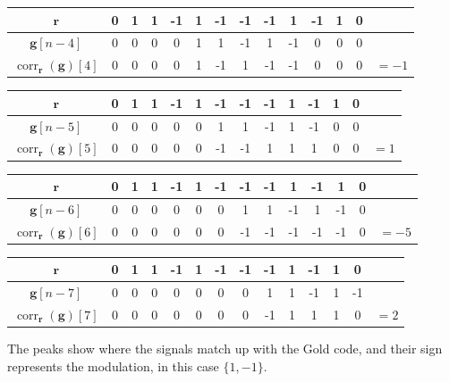 \documentclass[]{article}
\renewcommand{\vec}[1]{\mathbf{#1}}
\newcommand{\corr}{\operatorname{corr}}
\begin{document}
\begin{center}
\begin{tabular}{c|ccccccccccccc}
\end{tabular} \vspace{5 mm}
\begin{tabular}{c|ccccccccccccc}
	\(\vec{r}\) & 0 & 1 & 1 & -1 & 1 & -1 & -1 & -1 & 1 & -1 & 1 & 0 \\
	\hline
	\(\vec{g}[n - 4]\) & 0 & 0 & 0 & 0 & 1 & 1 & -1 & 1 & -1 & 0 & 0 & 0 \\
	\hline
	\(\corr_{\vec{r}}(\vec{g})[4]\) & 0 & 0 & 0 & 0 & 1 & -1 & 1 & -1 & -1 & 0 & 0 & 0 & \(= -1\) \\
\end{tabular} \vspace{5 mm}
\begin{tabular}{c|ccccccccccccc}
	\(\vec{r}\) & 0 & 1 & 1 & -1 & 1 & -1 & -1 & -1 & 1 & -1 & 1 & 0 \\
	\hline
	\(\vec{g}[n - 5]\) & 0 & 0 & 0 & 0 & 0 & 1 & 1 & -1 & 1 & -1 & 0 & 0 \\
	\hline
	\(\corr_{\vec{r}}(\vec{g})[5]\) & 0 & 0 & 0 & 0 & 0 & -1 & -1 & 1 & 1 & 1 & 0 & 0 & \(= 1\) \\
\end{tabular} \vspace{5 mm}
\begin{tabular}{c|ccccccccccccc}
	\(\vec{r}\) & 0 & 1 & 1 & -1 & 1 & -1 & -1 & -1 & 1 & -1 & 1 & 0 \\
	\hline
	\(\vec{g}[n - 6]\) & 0 & 0 & 0 & 0 & 0 & 0 & 1 & 1 & -1 & 1 & -1 & 0 \\
	\hline
	\(\corr_{\vec{r}}(\vec{g})[6]\) & 0 & 0 & 0 & 0 & 0 & 0 & -1 & -1 & -1 & -1 & -1 & 0 & \(= -5\) \\
\end{tabular} \vspace{5 mm}
\begin{tabular}{c|ccccccccccccc}
	\(\vec{r}\) & 0 & 1 & 1 & -1 & 1 & -1 & -1 & -1 & 1 & -1 & 1 & 0 \\
	\hline
	\(\vec{g}[n - 7]\) &  0& 0 & 0 & 0 & 0 & 0 & 0 & 1 & 1 & -1 & 1 & -1 \\
	\hline
	\(\corr_{\vec{r}}(\vec{g})[7]\) & 0 & 0 & 0 & 0 & 0 & 0 & 0 & -1 & 1 & 1 & 1 & 0 & \(= 2\) \\
\end{tabular} \vspace{5 mm}
\end{center}
The peaks show where the signals match up with the Gold code, and their sign represents the modulation, in this case \(\{1, -1\}\). 
\end{document}
